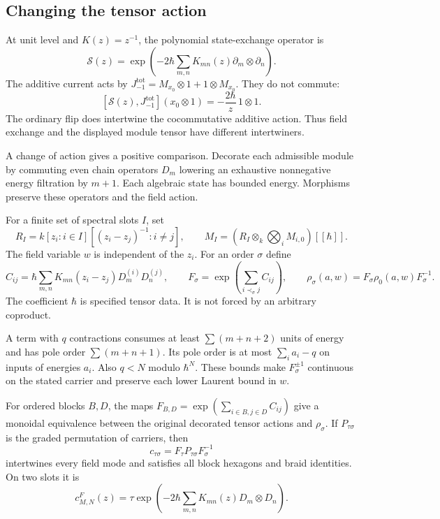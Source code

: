 \subsection{Changing the tensor action}

At unit level and $K(z)=z^{-1}$, the polynomial
state-exchange operator is
\[
 \mathcal S(z)=\exp\left(-2\hbar
 \sum_{m,n}K_{mn}(z)\partial_m\otimes\partial_n\right).
\]
The additive current acts by
$J_{-1}^{\mathrm{tot}}=M_{x_0}\otimes1+1\otimes M_{x_0}$.
They do not commute:
\[
 [\mathcal S(z),J_{-1}^{\mathrm{tot}}](x_0\otimes1)
 =-\frac{2\hbar}{z}\,1\otimes1.
\]
The ordinary flip does intertwine the cocommutative additive
action. Thus field exchange and the displayed module tensor
have different intertwiners.

A change of action gives a positive comparison.
Decorate each admissible module by commuting even chain
operators $D_m$ lowering an exhaustive nonnegative energy
filtration by $m+1$. Each algebraic state has bounded energy.
Morphisms preserve these operators and the field action.

For a finite set of spectral slots $I$, set
\[
 R_I=k[z_i:i\in I][(z_i-z_j)^{-1}:i\ne j],\qquad
 M_I=(R_I\otimes_k\bigotimes_iM_{i,0})[[\hbar]].
\]
The field variable $w$ is independent of the $z_i$.
For an order $\sigma$ define
\[
 C_{ij}=\hbar\sum_{m,n}
 K_{mn}(z_i-z_j)D_m^{(i)}D_n^{(j)},\qquad
 F_\sigma=\exp\left(\sum_{i\prec_\sigma j}C_{ij}\right),
 \qquad
 \rho_\sigma(a,w)=F_\sigma\rho_0(a,w)F_\sigma^{-1}.
\]
The coefficient $\hbar$ is specified tensor data.
It is not forced by an arbitrary coproduct.

A term with $q$ contractions consumes at least
$\sum(m+n+2)$ units of energy and has pole order
$\sum(m+n+1)$. Its pole order is at most
$\sum_i a_i-q$ on inputs of energies $a_i$.
Also $q<N$ modulo $\hbar^N$.
These bounds make $F_\sigma^{\pm1}$ continuous on the
stated carrier and preserve each lower Laurent bound in $w$.

\begin{theorem}
\label{v4-arith:centers:thm:spectral-transport}
For ordered blocks $B,D$, the maps
$F_{B,D}=\exp(\sum_{i\in B,j\in D}C_{ij})$
give a monoidal equivalence between the original decorated
tensor actions and $\rho_\sigma$.
If $P_{\tau\sigma}$ is the graded permutation of carriers,
then
\[
 c_{\tau\sigma}=F_\tau P_{\tau\sigma}F_\sigma^{-1}
\]
intertwines every field mode and satisfies all block
hexagons and braid identities. On two slots it is
\[
 c^F_{M,N}(z)=
 \tau\exp\left(-2\hbar\sum_{m,n}
 K_{mn}(z)D_m\otimes D_n\right).
\]
\end{theorem}

